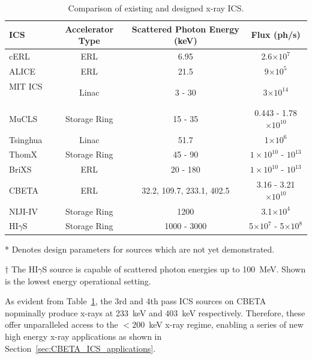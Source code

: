 \documentclass[../main.tex]{subfiles}
\begin{document}
\begin{table}[!h]
\caption{Comparison of existing and designed x-ray ICS.}
\begin{threeparttable}
\begin{tabular}{lccc}
\hline\hline
ICS & Accelerator Type & Scattered Photon Energy (\si{\kilo\electronvolt}) & Flux (ph/\si{\second}) \\
\hline
cERL \cite{akagi2016narrow} & ERL & 6.95 & 2.6$\times 10^{7}$ \\ 
ALICE \cite{priebe2008inverse,priebe2010first} & ERL & 21.5 & 9$\times 10^{5}$ \\
MIT ICS\tnote{*} ~\cite{graves2014compact} & Linac & 3 - 30 & 3$\times 10^{14}$ \\
MuCLS \cite{eggl2016munich} & Storage Ring & 15 - 35 & 0.443 - 1.78$\times 10^{10}$ \\ 
Tsinghua \cite{du2013generation} & Linac & 51.7 & 1$\times 10^{6}$ \\
ThomX\tnote{*} ~\cite{variola2014thomx,dupraz2020thomx} & Storage Ring & 45 - 90 & $1\times 10^{10}$ - $10^{13}$ \\
BriXS\tnote{*} ~\cite{faillace2019status,drebot2019brixs,cardarelli2020brixs} & ERL & 20 - 180 & $1\times 10^{10}$ - $10^{13}$ \\
CBETA\tnote{*} & ERL & 32.2, 109.7, 233.1, 402.5 & 3.16 - 3.21$\times 10^{10}$ \\ 
NIJI-IV \cite{sei2017demonstration} & Storage Ring & 1200 & 3.1$\times 10^{4}$ \\ 
HI$\gamma$S\tnote{$\dagger$} ~\cite{weller2009research} & Storage Ring & 1000 - 3000 & 5$\times 10^{7}$ - 5$\times 10^{8}$ \\
\hline\hline
\end{tabular}
\begin{tablenotes}
\item[*]{Denotes design parameters for sources which are not yet demonstrated.}
\item[$\dagger$]{The HI$\gamma$S source is capable of scattered photon energies up to 100~\si{\mega\electronvolt}. Shown is the lowest energy operational setting.}
\end{tablenotes}
\end{threeparttable}
\label{tab:xray_ICS_comparison}
\end{table}

As evident from Table~\ref{tab:xray_ICS_comparison}, the 3rd and 4th pass ICS sources on CBETA nopminally produce x-rays at 233~\si{\kilo\electronvolt} and 403~\si{\kilo\electronvolt} respectively. Therefore, these offer unparalleled access to the $< 200$~\si{\kilo\electronvolt} x-ray regime, enabling a series of new high energy x-ray applications as shown in Section~\ref{sec:CBETA_ICS_applications}.
\end{document}
